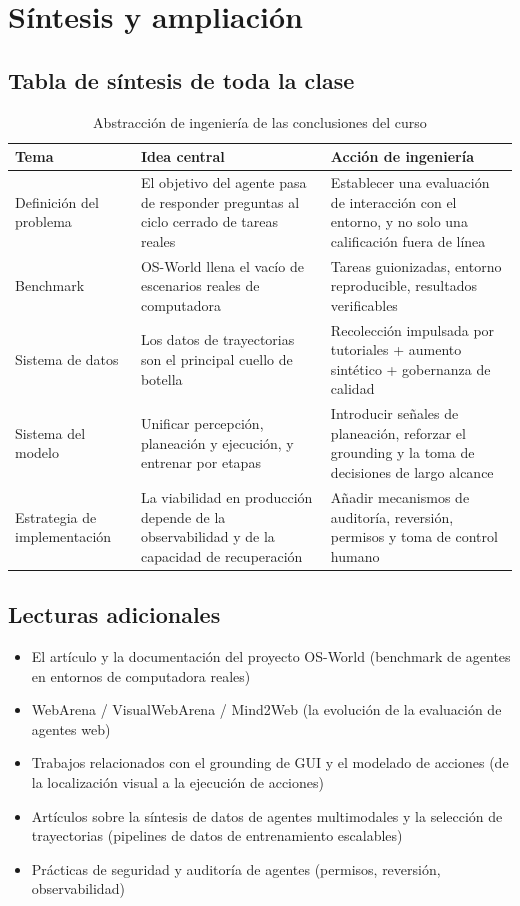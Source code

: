 \section{Síntesis y ampliación}

\subsection{Tabla de síntesis de toda la clase}
\begin{table}[H]
\centering
\begin{tabular}{p{3.0cm}p{4.6cm}p{4.0cm}}
\toprule
\textbf{Tema} & \textbf{Idea central} & \textbf{Acción de ingeniería} \\
\midrule
Definición del problema & El objetivo del agente pasa de responder preguntas al ciclo cerrado de tareas reales & Establecer una evaluación de interacción con el entorno, y no solo una calificación fuera de línea \\
Benchmark & OS-World llena el vacío de escenarios reales de computadora & Tareas guionizadas, entorno reproducible, resultados verificables \\
Sistema de datos & Los datos de trayectorias son el principal cuello de botella & Recolección impulsada por tutoriales + aumento sintético + gobernanza de calidad \\
Sistema del modelo & Unificar percepción, planeación y ejecución, y entrenar por etapas & Introducir señales de planeación, reforzar el grounding y la toma de decisiones de largo alcance \\
Estrategia de implementación & La viabilidad en producción depende de la observabilidad y de la capacidad de recuperación & Añadir mecanismos de auditoría, reversión, permisos y toma de control humano \\
\bottomrule
\end{tabular}
\caption{Abstracción de ingeniería de las conclusiones del curso}
\end{table}

\subsection{Lecturas adicionales}
\begin{itemize}
    \item El artículo y la documentación del proyecto OS-World (benchmark de agentes en entornos de computadora reales)
    \item WebArena / VisualWebArena / Mind2Web (la evolución de la evaluación de agentes web)
    \item Trabajos relacionados con el grounding de GUI y el modelado de acciones (de la localización visual a la ejecución de acciones)
    \item Artículos sobre la síntesis de datos de agentes multimodales y la selección de trayectorias (pipelines de datos de entrenamiento escalables)
    \item Prácticas de seguridad y auditoría de agentes (permisos, reversión, observabilidad)
\end{itemize}

